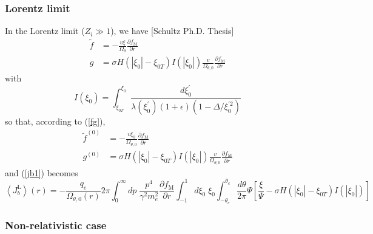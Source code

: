 \subsubsection{Lorentz limit}

In the Lorentz limit ($Z_{i}\gg1$), we have [Schultz Ph.D. Thesis]%
\begin{align}
\widetilde{f}  &  =-\frac{v\xi}{\Omega_{\theta}}\frac{\partial f_{\text{M}}%
}{\partial r}\label{ft}\\
g  &  =\sigma H\left(  \left|  \xi_{0}\right|  -\xi_{0T}\right)  I\left(
\left|  \xi_{0}\right|  \right)  \frac{v}{\Omega_{\theta,0}}\frac{\partial
f_{\text{M}}}{\partial r}\nonumber
\end{align}
with%
\begin{equation}
I\left(  \xi_{0}\right)  =\int_{\xi_{0T}}^{\xi_{0}}\frac{d\xi_{0}^{\prime}%
}{\lambda\left(  \xi_{0}^{\prime}\right)  \left(  1+\epsilon\right)  \left(
1-\Delta/\xi_{0}^{\prime2}\right)  }%
\end{equation}
so that, according to (\ref{fg}),%
\begin{align}
\widetilde{f}^{\left(  0\right)  }  &  =-\frac{v\xi_{0}}{\Omega_{\theta,0}%
}\frac{\partial f_{\text{M}}}{\partial r}\\
g^{\left(  0\right)  }  &  =\sigma H\left(  \left|  \xi_{0}\right|  -\xi
_{0T}\right)  I\left(  \left|  \xi_{0}\right|  \right)  \frac{v}%
{\Omega_{\theta,0}}\frac{\partial f_{\text{M}}}{\partial r}\nonumber
\end{align}
and (\ref{jb1}) becomes
\begin{equation}
\left\langle J_{b}^{\text{L}}\right\rangle \left(  r\right)  =-\frac{q_{e}%
}{\Omega_{\theta,0}\left(  r\right)  }2\pi\int_{0}^{\infty}dp\;\frac{p^{4}%
}{\gamma^{2}m_{e}^{2}}\frac{\partial f_{\text{M}}}{\partial r}\int_{-1}%
^{1}d\xi_{0}\;\xi_{0}\int_{-\theta_{c}}^{\theta_{c}}\frac{d\theta}{2\pi}%
\Psi\left[  \frac{\xi}{\Psi}-\sigma H\left(  \left|  \xi_{0}\right|  -\xi
_{0T}\right)  I\left(  \left|  \xi_{0}\right|  \right)  \right]
\end{equation}

\subsubsection{Non-relativistic case}

